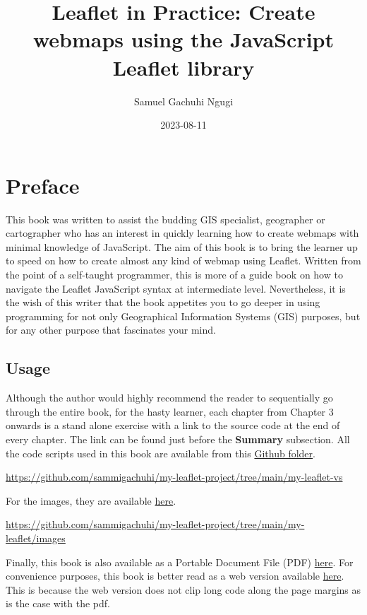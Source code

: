 \documentclass[
]{book}
\title{Leaflet in Practice: Create webmaps using the JavaScript Leaflet library}
\author{Samuel Gachuhi Ngugi}
\date{2023-08-11}
\begin{document}
\maketitle

{
\setcounter{tocdepth}{1}
\tableofcontents
}
\hypertarget{preface}{%
\chapter*{Preface}\label{preface}}

This book was written to assist the budding GIS specialist, geographer or cartographer who has an interest in quickly learning how to create webmaps with minimal knowledge of JavaScript. The aim of this book is to bring the learner up to speed on how to create almost any kind of webmap using Leaflet. Written from the point of a self-taught programmer, this is more of a guide book on how to navigate the Leaflet JavaScript syntax at intermediate level. Nevertheless, it is the wish of this writer that the book appetites you to go deeper in using programming for not only Geographical Information Systems (GIS) purposes, but for any other purpose that fascinates your mind.

\hypertarget{usage}{%
\section*{Usage}\label{usage}}

Although the author would highly recommend the reader to sequentially go through the entire book, for the hasty learner, each chapter from Chapter 3 onwards is a stand alone exercise with a link to the source code at the end of every chapter. The link can be found just before the \textbf{Summary} subsection. All the code scripts used in this book are available from this \href{https://github.com/sammigachuhi/my-leaflet-project/tree/main/my-leaflet-vs}{Github folder}.

\url{https://github.com/sammigachuhi/my-leaflet-project/tree/main/my-leaflet-vs}

For the images, they are available \href{https://github.com/sammigachuhi/my-leaflet-project/tree/main/my-leaflet/images}{here}.

\url{https://github.com/sammigachuhi/my-leaflet-project/tree/main/my-leaflet/images}

Finally, this book is also available as a Portable Document File (PDF) \href{https://github.com/sammigachuhi/my-leaflet-project/tree/main/my-leaflet/pdf_files}{here}. For convenience purposes, this book is better read as a web version available \href{https://bookdown.org/sammigachuhi/book-leaflet/}{here}. This is because the web version does not clip long code along the page margins as is the case with the pdf.
\end{document}
